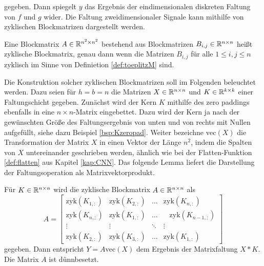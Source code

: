 gegeben.
Dann spiegelt $y$ das Ergebnis der eindimensionalen diskreten Faltung von $f$ und $g$ wider. Die Faltung zweidimensionaler Signale kann mithilfe von zyklischen Blockmatrizen dargestellt werden.
\begin{defi}
    \label{def:double_circ}
    Eine Blockmatrix $A \in \mathbb{R}^{n^2 \times n^2}$ bestehend aus Blockmatrizen $B_{i,j} \in \mathbb{R}^{n \times n}$ heißt zyklische Blockmatrix, genau dann wenn die Matrizen $B_{i,j}$ für alle $ 1 \leq i, j \leq n$ zyklisch im Sinne von Definietion \ref{def:toeplitzM} sind.
\end{defi}

Die Konstruktion solcher zyklischen Blockmatrizen soll im Folgenden beleuchtet werden. Dazu  seien für $h=b=n$ die Matrizen $X \in \mathbb{R}^{n \times n}$ und $K \in \mathbb{R}^{k \times k}$ einer Faltungschicht gegeben. Zunächst wird der Kern $K$ mithilfe des zero paddings ebenfalls in eine $n \times n$-Matrix eingebettet. Dazu wird der Kern ja nach der gewünschten Größe des Faltungsergebnis von unten und von rechts mit Nullen aufgefüllt, siehe dazu Beispiel \ref{bsp:Kzeropad}.
Weiter bezeichne $\mathrm{vec}(X)$ die Transformation der Matrix $X$ in einen Vektor der Länge $n^2$, indem die Spalten von $X$ untereinander geschrieben werden, ähnlich wie bei der Flatten-Funktion \ref{def:flatten} aus Kapitel \ref{kap:CNN}. Das folgende Lemma liefert die Darstellung der Faltungsoperation als Matrixvektorprodukt.

\begin{lem}
    Für $K \in \mathbb{R}^{n \times n}$ wird die zyklische Blockmatrix $A \in \mathbb{R}^{n \times n}$ als
    \begin{equation*}
        A=\begin{bmatrix}
            \mathrm{zyk}(K_{1,:}) &\mathrm{zyk}(K_{2,:}) &\ldots &\mathrm{zyk}(K_{n,:}) \\
            \mathrm{zyk}(K_{n,:}) &\mathrm{zyk}(K_{1,:}) &\ldots & \; \; \;\mathrm{zyk}(K_{n-1,:})\\
            \vdots &\vdots &\ddots &\vdots\\
            \mathrm{zyk}(K_{2,:}) &\mathrm{zyk}(K_{3,:}) &\ldots &\mathrm{zyk}(K_{1,:})
        \end{bmatrix}
    \end{equation*}
    gegeben. Dann entspricht $Y=A \mathrm{vec}(X)$ dem Ergebnis der Matrixfaltung $X \ast K$. Die Matrix $A$ ist dünnbesetzt. 
\end{lem}

